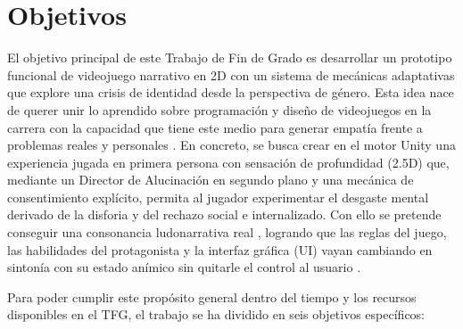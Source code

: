 \chapter{Objetivos}
\label{cap:objetivos}

El objetivo principal de este Trabajo de Fin de Grado es desarrollar un prototipo funcional de videojuego narrativo en \ac{2D} con un sistema de mecánicas adaptativas que explore una crisis de identidad desde la perspectiva de género. Esta idea nace de querer unir lo aprendido sobre programación y diseño de videojuegos en la carrera con la capacidad que tiene este medio para generar empatía frente a problemas reales y personales \parencite{bogost2011, navarro2023}. En concreto, se busca crear en el motor Unity una experiencia jugada en primera persona con sensación de profundidad (2.5D) que, mediante un Director de Alucinación en segundo plano y una mecánica de consentimiento explícito, permita al jugador experimentar el desgaste mental derivado de la disforia y del rechazo social e internalizado. Con ello se pretende conseguir una consonancia ludonarrativa real \parencite{hernandez2024}, logrando que las reglas del juego, las habilidades del protagonista y la interfaz gráfica (\ac{UI}) vayan cambiando en sintonía con su estado anímico sin quitarle el control al usuario \parencite{gomez2026}.

Para poder cumplir este propósito general dentro del tiempo y los recursos disponibles en el \ac{TFG}, el trabajo se ha dividido en seis objetivos específicos:


